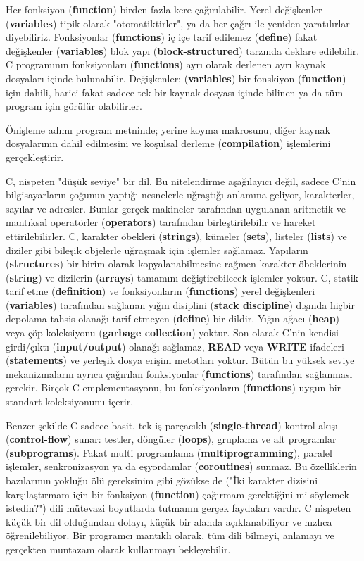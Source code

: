 \documentclass[a4paper,12pt,oneside]{book}
\begin{document}
\thispagestyle{introduction} \noindent Her fonksiyon (\textbf{function}) birden fazla kere çağırılabilir. Yerel değişkenler (\textbf{variables}) tipik olarak "otomatiktirler", ya da her çağrı ile yeniden yaratılırlar diyebiliriz. Fonksiyonlar (\textbf{functions}) iç içe tarif edilemez (\textbf{define}) fakat değişkenler (\textbf{variables}) blok yapı (\textbf{block-structured}) tarzında deklare edilebilir. C programının fonksiyonları (\textbf{functions}) ayrı olarak derlenen ayrı kaynak dosyaları içinde bulunabilir. Değişkenler; (\textbf{variables}) bir fonskiyon (\textbf{function}) için dahili, harici fakat sadece tek bir kaynak dosyası içinde bilinen ya da tüm program için görülür olabilirler.
\par Önişleme adımı program metninde; yerine koyma makrosunu, diğer kaynak dosyalarının dahil edilmesini ve koşulsal derleme (\textbf{compilation}) işlemlerini gerçekleştirir. \newline
\par C, nispeten "düşük seviye" bir dil. Bu nitelendirme aşağılayıcı değil, sadece C'nin bilgisayarların çoğunun yaptığı nesnelerle uğraştığı anlamına geliyor, karakterler, sayılar ve adresler. Bunlar gerçek makineler tarafından uygulanan aritmetik ve mantıksal operatörler (\textbf{operators}) tarafından birleştirilebilir ve hareket ettirilebilirler. C, karakter öbekleri (\textbf{strings}), kümeler (\textbf{sets}), listeler (\textbf{lists}) ve diziler gibi bileşik objelerle uğraşmak için işlemler sağlamaz. Yapıların (\textbf{structures}) bir birim olarak kopyalanabilmesine rağmen karakter öbeklerinin (\textbf{string}) ve dizilerin (\textbf{arrays}) tamamını değiştirebilecek işlemler yoktur. C, statik tarif etme (\textbf{definition}) ve fonksiyonların (\textbf{functions}) yerel değişkenleri (\textbf{variables}) tarafından sağlanan yığın disiplini (\textbf{stack discipline}) dışında hiçbir depolama tahsis olanağı tarif etmeyen (\textbf{define}) bir dildir. Yığın ağacı (\textbf{heap}) veya çöp koleksiyonu (\textbf{garbage collection}) yoktur. Son olarak C'nin kendisi girdi/çıktı (\textbf{input/output}) olanağı sağlamaz, \textbf{READ} veya \textbf{WRITE} ifadeleri (\textbf{statements}) ve yerleşik dosya erişim metotları yoktur. Bütün bu yüksek seviye mekanizmaların ayrıca çağırılan fonksiyonlar (\textbf{functions}) tarafından sağlanması gerekir. Birçok C emplementasyonu, bu fonksiyonların (\textbf{functions}) uygun bir standart koleksiyonunu içerir.
\par Benzer şekilde C sadece basit, tek iş parçacıklı (\textbf{single-thread}) kontrol akışı (\textbf{control-flow}) sunar: testler, döngüler (\textbf{loops}), gruplama ve alt programlar (\textbf{subprograms}). Fakat multi programlama (\textbf{multiprogramming}), paralel işlemler, senkronizasyon ya da eşyordamlar (\textbf{coroutines}) sunmaz. Bu özelliklerin bazılarının yokluğu ölü gereksinim gibi gözükse de ("İki karakter dizisini karşılaştırmam için bir fonksiyon (\textbf{function}) çağırmam gerektiğini mi söylemek istedin?") dili mütevazi boyutlarda tutmanın gerçek faydaları vardır. C nispeten küçük bir dil olduğundan dolayı, küçük bir alanda açıklanabiliyor ve hızlıca öğrenilebiliyor. Bir programcı mantıklı olarak, tüm dili bilmeyi, anlamayı ve gerçekten muntazam olarak kullanmayı bekleyebilir. \pagebreak
\end{document}
